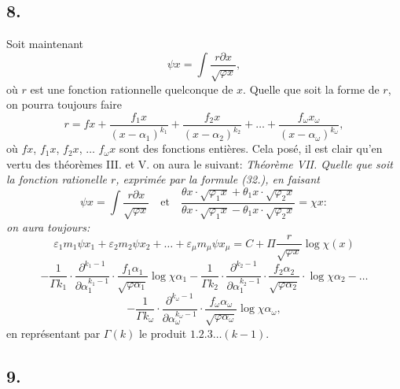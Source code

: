 \documentclass{article}
\begin{document}
\subsection*{8.}

Soit maintenant
\[ \psi x = \int \frac{r\partial x}{\sqrt{\varphi x}}, \]
où $r$ est une fonction rationnelle quelconque de $x$. Quelle que soit la forme de $r$, on pourra toujours faire
\[ r = fx + \frac{f_1 x}{(x-\alpha_1)^{k_1}} + \frac{f_2 x}{(x-\alpha_2)^{k_2}} + \ldots + \frac{f_\omega x_\omega}{(x-\alpha_\omega)^{k_\omega}}, \tag{32} \]
où $fx$, $f_1 x$, $f_2 x$, $\ldots$ $f_\omega x$ sont des fonctions entières. Cela posé, il est clair qu'en vertu des théorèmes III. et V. on aura le suivant:
\emph{Théorème VII. Quelle que soit la fonction rationelle $r$, exprimée par la formule (32.), en faisant}
\[ \psi x = \int \frac{r\partial x}{\sqrt{\varphi x}} \quad\text{et}\quad \frac{\theta x \cdot \sqrt{\varphi_1 x}+\theta_1 x \cdot \sqrt{\varphi_2 x}}{\theta x \cdot \sqrt{\varphi_1 x}-\theta_1 x \cdot \sqrt{\varphi_2 x}} = \chi x: \tag{33} \]
\emph{on aura toujours:}
\[ \varepsilon_1 m_1\psi x_1 + \varepsilon_2 m_2\psi x_2 + \ldots + \varepsilon_\mu m_\mu\psi x_\mu = C + \Pi\frac{r}{\sqrt{\varphi x}}\log\chi(x) \tag{34} \]
\[ - \frac{1}{\Gamma k_1} \cdot \frac{\partial^{k_1-1}}{\partial\alpha_1^{k_1-1}} \cdot \frac{f_1\alpha_1}{\sqrt{\varphi\alpha_1}}\log\chi\alpha_1 - \frac{1}{\Gamma k_2} \cdot \frac{\partial^{k_2-1}}{\partial\alpha_1^{k_2-1}} \cdot \frac{f_2\alpha_2}{\sqrt{\varphi\alpha_2}} \cdot \log\chi\alpha_2 - \ldots \]
\[ - \frac{1}{\Gamma k_\omega} \cdot \frac{\partial^{k_\omega-1}}{\partial\alpha_\omega^{k_\omega-1}} \cdot \frac{f_\omega\alpha_\omega}{\sqrt{\varphi\alpha_\omega}}\log\chi\alpha_\omega, \]
en représentant par $\Gamma(k)$ le produit $1.2.3\ldots(k-1)$.

\subsection*{9.}
\end{document}
